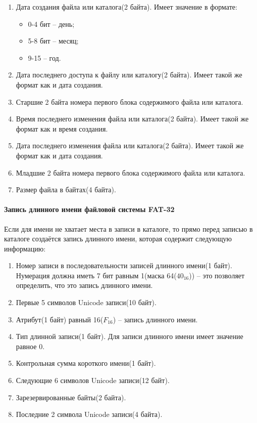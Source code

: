 \begin{enumerate}
\item Дата создания файла или каталога(2 байта). Имеет значение в формате:

	\begin{itemize}
	\item 0-4 бит -- день;
	\item 5-8 бит -- месяц;
	\item 9-15 -- год.
	\end{itemize}
	
\item Дата последнего доступа к файлу или каталогу(2 байта). Имеет такой же формат как и дата создания.
\item Старшие 2 байта номера первого блока содержимого файла или каталога.
\item Время последнего изменения файла или каталога(2 байта). Имеет такой же формат как и время создания.
\item Дата последнего изменения файла или каталога(2 байта). Имеет такой же формат как и дата создания.
\item Младшие 2 байта номера первого блока содержимого файла или каталога.
\item Размер файла в байтах(4 байта).
\end{enumerate}

\paragraph{Запись длинного имени файловой системы FAT-32}

Если для имени не хватает места в записи в каталоге, то прямо перед записью в каталоге создаётся запись длинного имени, которая содержит следующую информацию:

\begin{enumerate}
\item Номер записи в последовательности записей длинного имени(1 байт). Нумерация должна иметь 7 бит равным 1(маска 64($40_{16}$)) -- это позволяет определить, что это запись длинного имени.
\item Первые 5 символов Unicode записи(10 байт).
\item Атрибут(1 байт) равный 16($F_{16}$) -- запись длинного имени.
\item Тип длинной записи(1 байт). Для записи длинного имени имеет значение равное 0.
\item Контрольная сумма короткого имени(1 байт).
\item Следующие 6 символов Unicode записи(12 байт).
\item Зарезервированные байты(2 байта).
\item Последние 2 символа Unicode записи(4 байта).
\end{enumerate}

